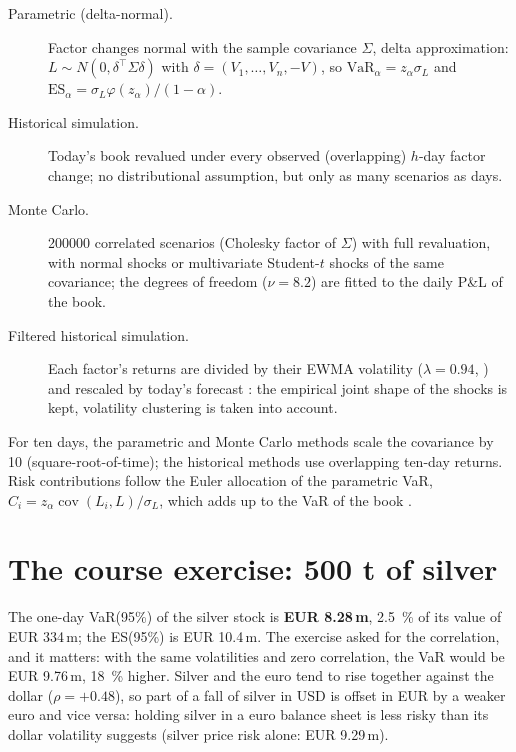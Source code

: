 \documentclass[11pt,a4paper]{article}
\begin{document}
\begin{description}
  \item[Parametric (delta-normal).] Factor changes normal with the sample covariance $\Sigma$, delta approximation:
    $L \sim N(0, \delta^\top \Sigma \delta)$ with $\delta = (V_1, \dots, V_n, -V)$, so
    $\mathrm{VaR}_\alpha = z_\alpha \sigma_L$ and $\mathrm{ES}_\alpha = \sigma_L \varphi(z_\alpha)/(1-\alpha)$.
  \item[Historical simulation.] Today's book revalued under every observed (overlapping) $h$-day factor change; no
    distributional assumption, but only as many scenarios as days.
  \item[Monte Carlo.] \num{200000} correlated scenarios (Cholesky factor of $\Sigma$) with full revaluation, with
    normal shocks or multivariate Student-$t$ shocks of the same covariance; the degrees of freedom ($\nu = 8.2$) are
    fitted to the daily P\&L of the book.
  \item[Filtered historical simulation.] Each factor's returns are divided by their EWMA volatility
    ($\lambda = 0.94$, \citealp{RiskMetrics1996}) and rescaled by today's forecast \citep{HullWhite1998}: the
    empirical joint shape of the shocks is kept, volatility clustering is taken into account.
\end{description}
For ten days, the parametric and Monte Carlo methods scale the covariance by 10 (square-root-of-time); the
historical methods use overlapping ten-day returns. Risk contributions follow the Euler allocation of the
parametric VaR, $C_i = z_\alpha \operatorname{cov}(L_i, L)/\sigma_L$, which adds up to the VaR of the book
\citep{Tasche1999}.

\section{The course exercise: 500 t of silver}

The one-day VaR(95\%) of the silver stock is \textbf{EUR 8.28\,m}, \SI{2.5}{\percent} of its value of EUR 334\,m;
the ES(95\%) is EUR 10.4\,m. The exercise asked for the correlation, and it matters: with the same volatilities
and zero correlation, the VaR would be EUR 9.76\,m, \SI{18}{\percent} higher. Silver and the euro tend to rise
together against the dollar ($\rho = +0.48$), so part of a fall of silver in USD is offset in EUR by a weaker euro and
vice versa: holding silver in a euro balance sheet is less risky than its dollar volatility suggests (silver price
risk alone: EUR 9.29\,m).
\end{document}
